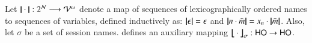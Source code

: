 \documentclass[runningheads]{llncs}
\begin{document}
{%

%

%




\begin{definition} \label{d:trabs}\label{d:auxmap}
	Let $|\!|\cdot|\!|: 2^{\mathcal{N}} \longrightarrow \mathcal{V}^\omega$
	denote a map of sequences of lexicographically ordered names to sequences of variables, defined
	inductively 
	as: 
	$|\!|\epsilon|\!| = \epsilon$ and $|\!|n \cdot \tilde{m}|\!| = x_n \cdot |\!|\tilde{m}|\!|$. 
	Also, let $\sigma$ be a set of session names.
	 defines an auxiliary mapping
	$\big\lfloor\!\!\big\lfloor\cdot\big\rfloor\!\!\big\rfloor^{}_\sigma: \mathsf{HO} \to \mathsf{HO}$.
\end{definition}

%






}
\end{document}
